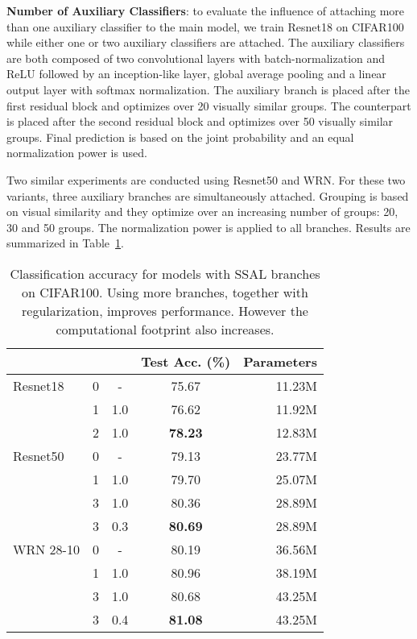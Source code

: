 \documentclass[10pt,twocolumn,letterpaper]{article}
\begin{document}
\textbf{Number of Auxiliary Classifiers}: to evaluate the influence of attaching more than one auxiliary classifier to the main model, we train Resnet18 on CIFAR100 while either one or two auxiliary classifiers  are attached.
The auxiliary classifiers are both composed of two convolutional layers with batch-normalization and ReLU followed by an inception-like layer, global average pooling and a linear output layer with softmax normalization.
The auxiliary branch  is placed after the first residual block and optimizes over 20 visually similar groups.
The  counterpart is placed after the second residual block and optimizes over 50 visually similar groups.
Final prediction is based on the joint probability and an equal normalization power  is used.

Two similar experiments are conducted using Resnet50 and WRN.
For these two variants, three auxiliary branches are simultaneously attached.
Grouping is based on visual similarity and they optimize over an increasing number of groups: 20, 30 and 50 groups.
The normalization power is applied to all branches.
Results are summarized in Table~\ref{tab:cifar100number}.

\begin{table}[t]
\centering
\begin{tabular}{@{}lcccr@{}}
\toprule
          &  &  & Test Acc. (\%) & Parameters \\ \midrule
Resnet18  & 0         & -      & 75.67              & 11.23M     \\
          & 1         & 1.0    & 76.62             & 11.92M     \\
          & 2         & 1.0    & \textbf{78.23}     & 12.83M     \\ \midrule
Resnet50  & 0         & -      & 79.13              & 23.77M     \\
          & 1         & 1.0    & 79.70              & 25.07M     \\
          & 3         & 1.0    & 80.36              & 28.89M     \\
          & 3         & 0.3    & \textbf{80.69}     & 28.89M     \\ \midrule
WRN 28-10 & 0         & -      & 80.19              & 36.56M     \\
          & 1         & 1.0    & 80.96              & 38.19M     \\
          & 3         & 1.0    & 80.68              & 43.25M     \\
          & 3         & 0.4    & \textbf{81.08}     & 43.25M     \\ \bottomrule
\end{tabular}
\caption{Classification accuracy for models with  SSAL branches on CIFAR100. Using more branches, together with regularization, improves performance. However the computational footprint also increases.}
\label{tab:cifar100number}
\end{table}
\end{document}
